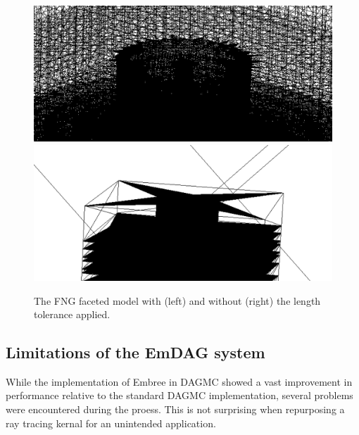 \documentclass[12pt, a4paper]{article}
\begin{document}
\begin{figure}[H]
  \small
  \begin{center}
    \includegraphics[scale=0.15]{fng_len_tol.png}
    \includegraphics[scale=0.15]{fng_facet_tol.png}
    \caption{The FNG faceted model with (left) and without (right) the length tolerance applied.}
    \label{fng-faceted-models}
  \end{center}

\end{figure}



\subsection{Limitations of the EmDAG system}%

While the implementation of Embree in DAGMC showed a vast improvement in performance relative to the standard DAGMC implementation, several problems were encountered during the proess. This is not surprising when repurposing a ray tracing kernal for an unintended application.
\end{document}
